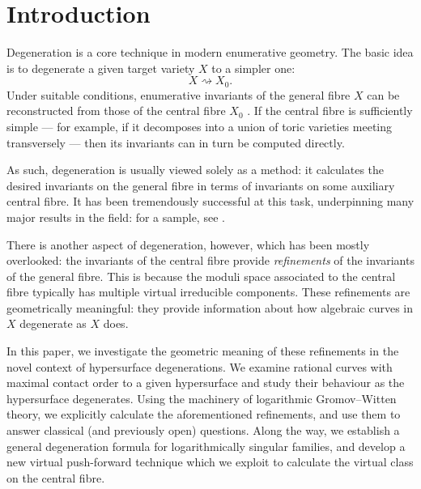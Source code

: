 \documentclass[11pt]{amsart}
\theoremstyle{definition}
\theoremstyle{definition}
\begin{document}
\vfill

\newpage

\section{Introduction}

\noindent Degeneration is a core technique in modern enumerative geometry. The basic idea is to degenerate a given target variety $X$ to a simpler one:
\begin{equation*} X \rightsquigarrow X_0. \end{equation*}
Under suitable conditions, enumerative invariants of the general fibre $X$ can be reconstructed from those of the central fibre $X_0$ \cite{Li2,AbramovichChenGrossSiebertDegeneration,ACGSPunctured,RangExpansions}. If the central fibre is sufficiently simple --- for example, if it decomposes into a union of toric varieties meeting transversely --- then its invariants can in turn be computed directly.

As such, degeneration is usually viewed solely as a method: it calculates the desired invariants on the general fibre in terms of invariants on some auxiliary central fibre. It has been tremendously successful at this task, underpinning many major results in the field: for a sample, see \cite{MaulikPandharipande,OkounkovPandharipandeMatrix,GPS,PandharipandePixtonQuintic}.

There is another aspect of degeneration, however, which has been mostly overlooked: the invariants of the central fibre provide \emph{refinements} of the invariants of the general fibre. This is because the moduli space associated to the central fibre typically has multiple virtual irreducible components. These refinements are geometrically meaningful: they provide information about how algebraic curves in $X$ degenerate as $X$ does.

In this paper, we investigate the geometric meaning of these refinements in the novel context of hypersurface degenerations. We examine rational curves with maximal contact order to a given hypersurface and study their behaviour as the hypersurface degenerates. Using the machinery of logarithmic Gromov--Witten theory, we explicitly calculate the aforementioned refinements, and use them to answer classical (and previously open) questions. Along the way, we establish a general degeneration formula for logarithmically singular families, and develop a new virtual push-forward technique which we exploit to calculate the virtual class on the central fibre.
\end{document}
